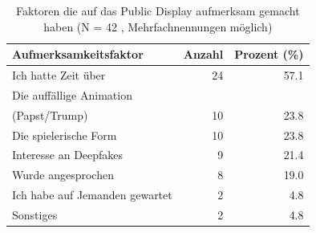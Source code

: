 \begin{table}[htbp]
\centering
\caption{Faktoren die auf das Public Display aufmerksam gemacht haben (N = 42 , Mehrfachnennungen möglich)} 
\label{tab:attention_factors}
\begin{tabular}{lrr}
  \toprule
Aufmerksamkeitsfaktor & Anzahl & Prozent (\%) \\ 
  \midrule
Ich hatte Zeit über & 24 & 57.1 \\ 
  Die auffällige Animation\\(Papst/Trump) & 10 & 23.8 \\ 
  Die spielerische Form & 10 & 23.8 \\ 
  Interesse an Deepfakes & 9 & 21.4 \\ 
  Wurde angesprochen & 8 & 19.0 \\ 
  Ich habe auf Jemanden gewartet & 2 & 4.8 \\ 
  Sonstiges & 2 & 4.8 \\ 
   \bottomrule
\end{tabular}
\end{table}
